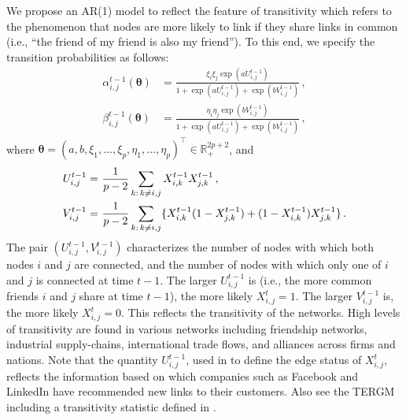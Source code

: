 \documentclass[12pt]{article}
\newcommand{\btheta}{\boldsymbol \theta}
\newcommand{\0}{{\bf 0}}
\begin{document}
We propose an AR(1) model to reflect the feature of transitivity which
refers to the phenomenon that nodes are more likely to link if they share
links in common (i.e., ``the friend of my friend is also my friend'').
 To this end, we specify the transition probabilities as follows:
\begin{equation} \label{trans-model}
\begin{split}
    \alpha_{i,j}^{t-1}(\btheta) &= \frac{\xi_i \xi_j\exp(a U_{i,j}^{t-1}) }{1+ \exp(a U_{i,j}^{t-1})+ \exp(b V_{i,j}^{t-1})}\,,\\
    \beta_{i,j}^{t-1}(\btheta) &=\frac{ \eta_i \eta_j \exp(b V_{i,j}^{t-1})}  {1+ \exp(a U_{i,j}^{t-1})+ \exp(b V_{i,j}^{t-1})}\,,
    \end{split}
\end{equation}
where $\btheta = (a, b, \xi_1, \ldots, \xi_p, \eta_1, \ldots, \eta_p)^\top\in\mathbb{R}_+^{2p+2}$, and
\begin{equation}
    \label{UVij}
    \begin{split}
U_{i,j}^{t-1} =&~ {1\over p-2}\sum_{k:\,k\neq i,j} X_{i,k}^{t-1} X_{j,k}^{t-1}\,,\\ V_{i,j}^{t-1} =&~{1 \over p-2} \sum_{k:\,k\neq i, j}\{X_{i,k}^{t-1}(1-X_{j,k}^{t-1})+ (1-X_{i,k}^{t-1})X_{j,k}^{t-1}\}\,.
\end{split}
\end{equation}
 The pair $(U_{i,j}^{t-1}, V_{i,j}^{t-1})$ characterizes the  number of
nodes with which both nodes $i$ and $j$ are connected,  and the  number of nodes
with which only one of $i$ and $j$ is connected at  time $t-1$.  The larger $U_{i,j}^{t-1}$ is (i.e., the more common friends $i$ and $j$ share at time $t-1$), the more likely $X_{i,j}^{t} = 1$. The larger $V_{i,j}^{t-1}$ is, the more likely $X_{i,j}^{t} = 0$. This reflects the transitivity of the networks. High levels of transitivity are found in various networks including friendship networks, industrial supply-chains, international trade flows, and alliances across firms and nations.   Note that the quantity $U_{i,j}^{t-1}$, used in \cite{graham2016} to define the edge status of $X_{i,j}^t$, reflects
the information based on which companies such as Facebook and LinkedIn have recommended new links to their customers. Also see the TERGM including a transitivity statistic defined in \cite{hanneke2010}.
\end{document}
